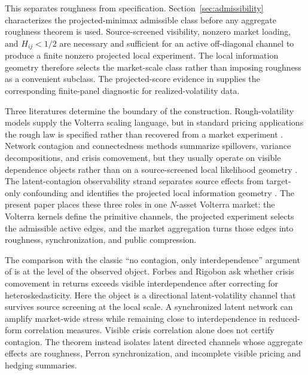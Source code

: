 \documentclass[11pt,a4paper]{amsart}
\theoremstyle{plain}
\theoremstyle{definition}
\theoremstyle{remark}
\begin{document}
This separates roughness from specification.  Section~\ref{sec:admissibility} characterizes the
projected-minimax admissible class before any aggregate roughness theorem is used.  Source-screened
visibility, nonzero market loading, and \(H_{ij}<1/2\) are necessary and sufficient for an active
off-diagonal channel to produce a finite nonzero projected local experiment.  The local information
geometry therefore selects the market-scale class rather than imposing roughness as a convenient
subclass.  The projected-score evidence in \cite{vidal2026econometric} supplies the
corresponding finite-panel diagnostic for realized-volatility data.

Three literatures determine the boundary of the construction.  Rough-volatility models supply the
Volterra scaling language, but in standard pricing applications the rough law is specified rather
than recovered from a market experiment \cite{gatheral2018volatility,bayer2016pricing,cont2024artefact}.
Network contagion and connectedness methods summarize spillovers, variance decompositions, and
crisis comovement, but they usually operate on visible dependence objects rather than on a
source-screened local likelihood geometry \cite{diebold2009spillovers,diebold2014connectedness,forbes2002interdependence}.
The latent-contagion observability strand separates source effects from target-only confounding and
identifies the projected local information geometry
\cite{vidal2026latent,vidal2026dynamic,vidal2026econometric}.  The present paper places these three
roles in one \(N\)-asset Volterra market: the Volterra kernels define the primitive channels, the
projected experiment selects the admissible active edges, and the market aggregation turns those
edges into roughness, synchronization, and public compression.

The comparison with the classic ``no contagion, only interdependence'' argument of
\cite{forbes2002interdependence} is at the level of the observed object.  Forbes and Rigobon ask
whether crisis comovement in returns exceeds visible interdependence after correcting for
heteroskedasticity.  Here the object is a directional latent-volatility channel that survives source
screening at the local scale.  A synchronized latent network can amplify market-wide stress while
remaining close to interdependence in reduced-form correlation measures.  Visible crisis
correlation alone does not certify contagion.  The theorem instead isolates latent directed channels
whose aggregate effects are roughness, Perron synchronization, and incomplete visible pricing and
hedging summaries.
\end{document}

